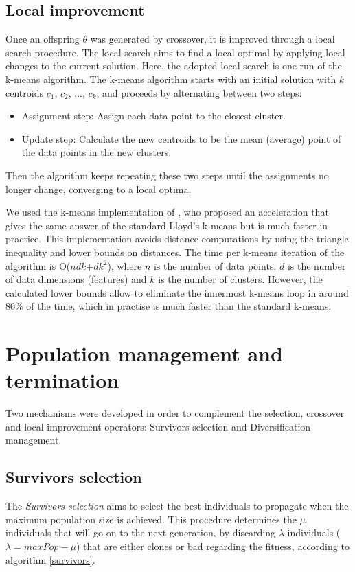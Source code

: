 \subsection{Local improvement}
Once an offspring $\theta$ was generated by crossover, it is improved through a local search procedure. The local search aims to find a local optimal by applying local changes to the current solution. Here, the adopted local search is one run of the k-means algorithm. The k-means algorithm starts with an initial solution with $k$ centroids $c_1$, $c_2$, ..., $c_k$, and proceeds by alternating between two steps:

\begin{itemize}

	\item Assignment step: Assign each data point to the closest cluster.

	\item Update step: Calculate the new centroids to be the mean (average) point of the data points in the new clusters.
	
\end{itemize}

Then the algorithm keeps repeating these two steps until the assignments no longer change, converging to a local optima.

We used the k-means implementation of \cite{Hamerly2010}, who proposed an acceleration that gives the same answer of the standard Lloyd's k-means but is much faster in practice. This implementation avoids distance computations by using the triangle inequality and lower bounds on distances. The time per k-means iteration of the algorithm is O($ndk$+$dk^2$), where $n$ is the number of data points, $d$ is the number of data dimensions (features) and $k$ is the number of clusters. However, the calculated lower bounds allow to eliminate the innermost k-means loop in around 80\% of the time, which in practise is much faster than the standard k-means.

\section{Population management and termination}
Two mechanisms were developed in order to complement the selection, crossover and local improvement operators: Survivors selection and Diversification management.

\subsection{Survivors selection}
The \textit{Survivors selection} aims to select the best individuals to propagate when the maximum population size is achieved. This procedure determines the $\mu$ individuals that will go on to the next generation, by discarding $\lambda$ individuals ($\lambda = maxPop - \mu$) that are either clones or bad regarding the fitness, according to algorithm \ref{survivors}.


